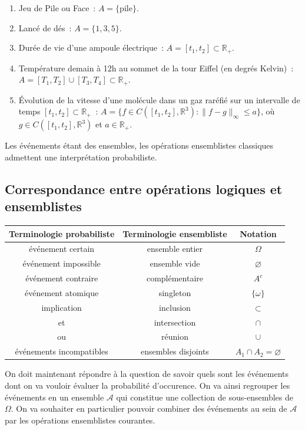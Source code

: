 \begin{exemple}\label{I-exemples-2}
\begin{enumerate}
\def\labelenumi{\arabic{enumi}.}
\tightlist
\item
  Jeu de Pile ou Face~: \(A = \{\text{pile}\}\).
\item
  Lancé de dés~: \(A = \{1,3,5\}\).
\item
  Durée de vie d'une ampoule électrique~:
  \(A = [t_1,t_2] \subset \mathbb{R}_+\).
\item
  Température demain à 12h au sommet de la tour Eiffel (en degrés
  Kelvin)~: \(A = [T_1,T_2]\cup[T_3,T_4] \subset \mathbb{R}_+\).
\item
  Évolution de la vitesse d'une molécule dans un gaz raréfié sur un
  intervalle de temps \([t_1,t_2] \subset \mathbb{R}_+\)~:
  \(A = \{ f \in C([t_1,t_2], \mathbb{R}^3) : \|f-g\|_{\infty} \leq a \}\),
  où \(g \in C([t_1,t_2],\mathbb{R}^3)\) et \(a \in \mathbb{R}_+\).
\end{enumerate}

Les événements étant des ensembles, les opérations ensemblistes
classiques admettent une interprétation probabiliste.
\end{exemple}

\subsection*{Correspondance entre opérations logiques et
ensemblistes}\label{I-correspondance-entre-opuxe9rations-logiques-et-ensemblistes}

\begin{longtable}[]{@{}ccc@{}}
\toprule
Terminologie probabiliste & Terminologie ensembliste &
Notation\tabularnewline
\midrule
\endhead
événement certain & ensemble entier & \(\Omega\)\tabularnewline
événement impossible & ensemble vide & \(\varnothing\)\tabularnewline
événement contraire & complémentaire & \(A^c\)\tabularnewline
événement atomique & singleton & \(\{\omega\}\)\tabularnewline
implication & inclusion & \(\subset\)\tabularnewline
et & intersection & \(\cap\)\tabularnewline
ou & réunion & \(\cup\)\tabularnewline
événements incompatibles & ensembles disjoints &
\(A_1\cap A_2 = \varnothing\)\tabularnewline
\bottomrule
\end{longtable}

On doit maintenant répondre à la question de savoir quels sont les
événements dont on va vouloir évaluer la probabilité d'occurence. On va
ainsi regrouper les événements en un ensemble \(\mathcal{A}\) qui
constitue une collection de sous-ensembles de \(\Omega\). On va
souhaiter en particulier pouvoir combiner des événements au sein de
\(\mathcal{A}\) par les opérations ensemblistes courantes.

